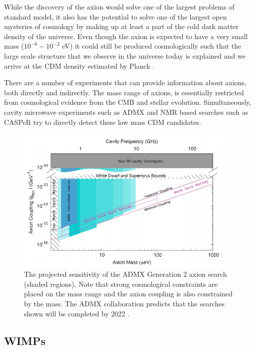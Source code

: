 While the discovery of the axion would solve one of the largest problems of standard model, it also has the potential to solve one of the largest open mysteries of cosmology by making up at least a part of the cold dark matter density of the universe.  Even though the axion is expected to have a very small mass ($10^{-6}-10^{-2}$ eV) it could still be produced cosmologically such that the large scale structure that we observe in the universe today is explained and we arrive at the CDM density estimated by Planck \cite{graham2015experimental}.

    There are a number of experiments that can provide information about axions, both directly and indirectly.  The mass range of axions, is essentially restricted from cosmological evidence from the CMB and stellar evolution.  Simultaneously, cavity microwave experiments such as ADMX \cite{stern2016admx} and NMR based searches such as CASPeR \cite{garcon2017searching} try to directly detect these low mass CDM candidates.

\begin{figure}[t]
	\centering
	\includegraphics[width=0.95\textwidth]{admx2_limits}
	\caption{The projected sensitivity of the ADMX Generation 2 axion search (shaded regions).  Note that strong cosmological constraints are placed on the mass range and the axion coupling is also constrained by the mass.  The ADMX collaboration predicts that the searches shown will be completed by 2022 \cite{stern2016admx}.}
\end{figure}

\subsection{WIMPs}


